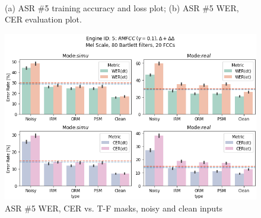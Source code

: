 \begin{figure}[H]
    \centering
    \\
    \vspace{-0.3cm}
    \caption{(a) ASR \#5 training accuracy and loss plot;\;\;
        (b) ASR \#5 WER, CER evaluation plot.}\label{fig:asr5_wer_subplot} 
\end{figure}

\begin{figure}[H]
    \centering
    \includegraphics[width=0.95\linewidth]{ASR/images/asr5_wer_masks.png}
    \caption{ASR \#5 WER, CER vs. T-F masks, noisy and clean inputs}\label{fig:asr5_wer_masks}
\end{figure}

